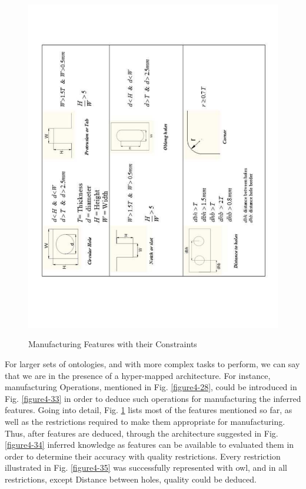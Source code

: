 \begin{figure}
\begin{minipage}{.5\textwidth}
		\includegraphics[scale=0.35, angle=270]{figure-chapterIV/fig4-41}\\
		\caption{Manufacturing Features with their Constraints}
		\label{figure4-41}
	\end{minipage}%
\end{figure}










For larger sets of ontologies, and with more complex tasks to perform, we can say that we are in the presence of a hyper-mapped architecture. For instance, manufacturing Operations, mentioned in Fig. \ref{figure4-28}, could be introduced in Fig. \ref{figure4-33} in order to deduce such operations for manufacturing the inferred features. Going into detail, Fig. \ref{figure4-41} lists most of the features mentioned so far, as well as the restrictions required to make them appropriate for manufacturing. Thus, after features are deduced, through the architecture suggested in Fig. \ref{figure4-34} inferred knowledge as features can be available to evaluated  them in order to determine their accuracy with quality restrictions. Every restriction illustrated in Fig. \ref{figure4-35} was successfully represented with \gls{owl}, and in all restrictions,    except Distance between holes, quality could be deduced. 


